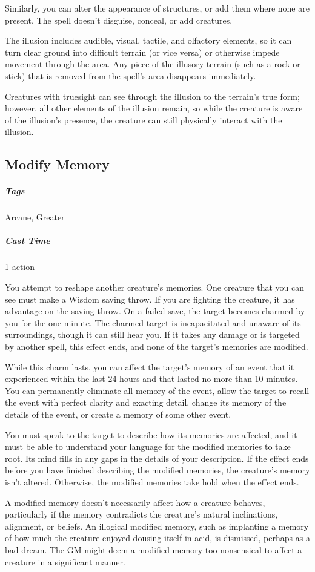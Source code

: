 Similarly, you can alter the appearance of structures, or add them where none are present. The spell doesn't disguise, conceal, or add creatures.

The illusion includes audible, visual, tactile, and olfactory elements, so it can turn clear ground into difficult terrain (or vice versa) or otherwise impede movement through the area. Any piece of the illusory terrain (such as a rock or stick) that is removed from the spell's area disappears immediately.

Creatures with truesight can see through the illusion to the terrain's true form; however, all other elements of the illusion remain, so while the creature is aware of the illusion's presence, the creature can still physically interact with the illusion.

\subsection{Modify Memory}\label{spell:modify-memory}
\subparagraph*{Tags} Arcane, Greater
\subparagraph*{Cast Time} 1 action

You attempt to reshape another creature's memories. One creature that you can see must make a Wisdom saving throw. If you are fighting the creature, it has advantage on the saving throw. On a failed save, the target becomes charmed by you for the one minute. The charmed target is incapacitated and unaware of its surroundings, though it can still hear you. If it takes any damage or is targeted by another spell, this effect ends, and none of the target's memories are modified.

While this charm lasts, you can affect the target's memory of an event that it experienced within the last 24 hours and that lasted no more than 10 minutes. You can permanently eliminate all memory of the event, allow the target to recall the event with perfect clarity and exacting detail, change its memory of the details of the event, or create a memory of some other event.

You must speak to the target to describe how its memories are affected, and it must be able to understand your language for the modified memories to take root. Its mind fills in any gaps in the details of your description. If the effect ends before you have finished describing the modified memories, the creature's memory isn't altered. Otherwise, the modified memories take hold when the effect ends.

A modified memory doesn't necessarily affect how a creature behaves, particularly if the memory contradicts the creature's natural inclinations, alignment, or beliefs. An illogical modified memory, such as implanting a memory of how much the creature enjoyed dousing itself in acid, is dismissed, perhaps as a bad dream. The GM might deem a modified memory too nonsensical to affect a creature in a significant manner.

